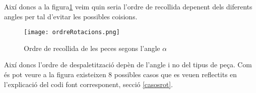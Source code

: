 Així doncs a la figura\ref{figrecpec}
veim quin seria l'ordre de recollida depenent dels diferents angles per tal
d'evitar les possibles co\lgem isions.

\begin{figure}[H]
\begin{center}\label{figrecpec}
 \texttt{[image: ordreRotacions.png]}
\end{center}
  \caption{Ordre de recollida de les peces segons l'angle $\alpha$}
\end{figure}

Així doncs l'ordre de despaletització depèn de l'angle i no del tipus de peça.
Com és pot veure a la figura existeixen 8 possibles casos que es veuen
reflectits en l'explicació del codi font corresponent, secció \ref{casosrot}.